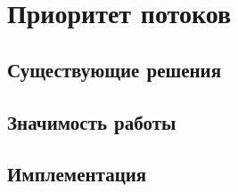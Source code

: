 \section{Приоритет потоков}\label{thread_priority}
\subsection{Существующие решения}
\subsection{Значимость работы}
\subsection{Имплементация}
